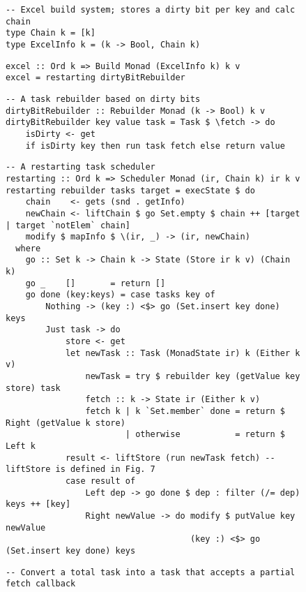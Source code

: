 \begin{figure}
\begin{verbatim}
-- Excel build system; stores a dirty bit per key and calc chain
type Chain k = [k]
type ExcelInfo k = (k -> Bool, Chain k)
\end{verbatim}
\vspace{1mm}
\begin{verbatim}
excel :: Ord k => Build Monad (ExcelInfo k) k v
excel = restarting dirtyBitRebuilder
\end{verbatim}
\vspace{1mm}
\begin{verbatim}
-- A task rebuilder based on dirty bits
dirtyBitRebuilder :: Rebuilder Monad (k -> Bool) k v
dirtyBitRebuilder key value task = Task $ \fetch -> do
    isDirty <- get
    if isDirty key then run task fetch else return value
\end{verbatim}
\vspace{1mm}
\begin{verbatim}
-- A restarting task scheduler
restarting :: Ord k => Scheduler Monad (ir, Chain k) ir k v
restarting rebuilder tasks target = execState $ do
    chain    <- gets (snd . getInfo)
    newChain <- liftChain $ go Set.empty $ chain ++ [target | target `notElem` chain]
    modify $ mapInfo $ \(ir, _) -> (ir, newChain)
  where
    go :: Set k -> Chain k -> State (Store ir k v) (Chain k)
    go _    []       = return []
    go done (key:keys) = case tasks key of
        Nothing -> (key :) <$> go (Set.insert key done) keys
        Just task -> do
            store <- get
            let newTask :: Task (MonadState ir) k (Either k v)
                newTask = try $ rebuilder key (getValue key store) task
                fetch :: k -> State ir (Either k v)
                fetch k | k `Set.member` done = return $ Right (getValue k store)
                        | otherwise           = return $ Left k
            result <- liftStore (run newTask fetch) -- liftStore is defined in Fig. 7
            case result of
                Left dep -> go done $ dep : filter (/= dep) keys ++ [key]
                Right newValue -> do modify $ putValue key newValue
                                     (key :) <$> go (Set.insert key done) keys
\end{verbatim}
\vspace{1mm}
\begin{verbatim}
-- Convert a total task into a task that accepts a partial fetch callback

\end{verbatim}
\end{figure}
